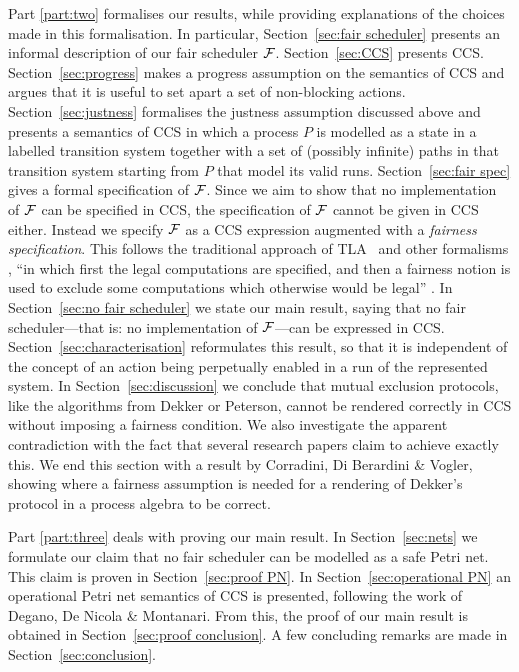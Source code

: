 \documentclass[smallcondensed]{svjour3}
\makeatletter
\newcommand{\Part}[1]{Part {\ref{part:#1}}}
\newcommand{\Sect}[1]{Section~\ref{sec:#1}}
\newcommand{\mand}{\&\xspace}
\newcounter {part}
\renewcommand\thepart{\@Roman\c@part}
\def\part#1#2{\vspace{6ex}
\noindent {\Large\bf\boldmath Part \refstepcounter{part}\thepart\ \ \ #1\label{part:#2}}

\vspace{-3.5ex}
}
\makeatother
\begin{document}
\Part{two} formalises our results, while providing explanations of the choices made in this formalisation.
In particular, \Sect{fair scheduler} presents an informal description of our fair
scheduler $\cal F$.  \Sect{CCS} presents CCS\@.
\Sect{progress} makes a 
progress assumption on the semantics of CCS and argues that it is
useful to set apart a set of non-blocking actions.
\Sect{justness} formalises the justness assumption discussed above and presents a semantics of CCS in which a process
$P$ is modelled as a state in a labelled transition system together with a set of (possibly
infinite) paths in that transition system starting from $P$ that model its valid runs.
 \Sect{fair spec} gives a formal specification of $\cal F$.
Since we aim to show that no implementation of $\cal F$ can be
specified in CCS, the specification of $\cal F$ cannot be given in CCS
either.  Instead we specify $\cal F$ as a CCS expression augmented
with a \emph{fairness specification}.  This follows the traditional
approach of TLA~\cite{TLA} and other formalisms \cite{Fr86}, ``in which
first the legal computations are specified, and then a fairness notion
is used to exclude some computations which otherwise would be legal'' \cite{AFK88}.
In \Sect{no fair scheduler} we state our main result, saying that no fair scheduler---that is: no
implementation of $\cal F$---can be expressed in CCS\@.
\Sect{characterisation} reformulates this result, so that it is
independent of the concept of an action being perpetually enabled in a run of the represented system.
In \Sect{discussion} we conclude that mutual exclusion
protocols, like the algorithms from Dekker or Peterson, cannot be
rendered correctly in CCS without imposing a fairness condition.
We also investigate the apparent contradiction with the fact that
several research papers claim to achieve exactly this.
We end this section with a result by Corradini, Di Berardini \mand Vogler,
showing where a fairness assumption is needed for a rendering
of Dekker's protocol in a process algebra to be correct.

\Part{three} deals with proving our main result.
In \Sect{nets} we formulate our claim that no fair scheduler can be modelled as a 
safe Petri net. This claim is proven in \Sect{proof PN}.
In \Sect{operational PN} an operational Petri net semantics of CCS is
presented, following the work of Degano, De Nicola \mand Montanari.
From this, the proof of our main result is obtained in \Sect{proof conclusion}.
A few concluding remarks are made in \Sect{conclusion}.


\part{Formalisation}{two}
\end{document}
